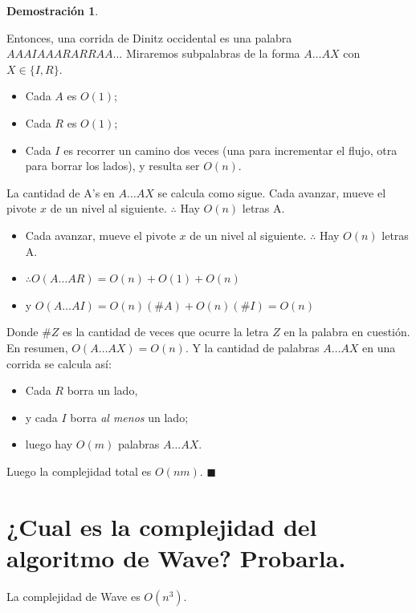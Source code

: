 \documentclass[11pt, a4paper]{article}
\theoremstyle{definition}
\newtheorem*{demostracion}{Demostración}
\begin{document}
\begin{demostracion}
\begin{itemize}
            Entonces, una corrida de Dinitz occidental es una palabra $AAAIAAARARRAA\ldots$
            Miraremos subpalabras de la forma $A\ldots AX$ con $X \in \{I, R\}$. 
            \begin{itemize}[noitemsep, nolistsep]
                \item Cada $A$ es $O(1)$;
                \item Cada $R$ es $O(1)$;
                \item Cada $I$ es recorrer un camino dos veces (una para incrementar el flujo, otra para borrar los lados), y resulta ser $O(n)$.
            \end{itemize}
            La cantidad de A's en $A\ldots AX$ se calcula como sigue. Cada avanzar, mueve el pivote
            $x$ de un nivel al siguiente. $\therefore$ Hay $O(n)$ letras A.
            \begin{itemize}[noitemsep, nolistsep]
                \item Cada avanzar, mueve el pivote $x$ de un nivel al siguiente. $\therefore$ Hay $O(n)$ letras A.
                \item $\therefore O(A\ldots AR) = O(n) + O(1) + O(n)$
                \item y $O(A\ldots AI) = O(n)(\#A) + O(n)(\#I) = O(n)$
            \end{itemize}
            Donde $\#Z$ es la cantidad de veces que ocurre la letra $Z$ en la palabra en cuestión. En
            resumen, $O(A\ldots AX) = O(n)$. Y la cantidad de palabras $A\ldots AX$ en una corrida se
            calcula así: 
            \begin{itemize}[noitemsep, nolistsep]
                \item Cada $R$ borra un lado, 
                \item y cada $I$ borra \textit{al menos} un lado;
                \item luego hay $O(m)$ palabras $A\ldots AX$.
            \end{itemize}
              Luego la complejidad total es $O(nm)$. $\blacksquare$
    \end{itemize}
\end{demostracion}


\section{¿Cual es la complejidad del algoritmo de Wave? Probarla.}
La complejidad de Wave es $O(n^3)$.
\end{document}
